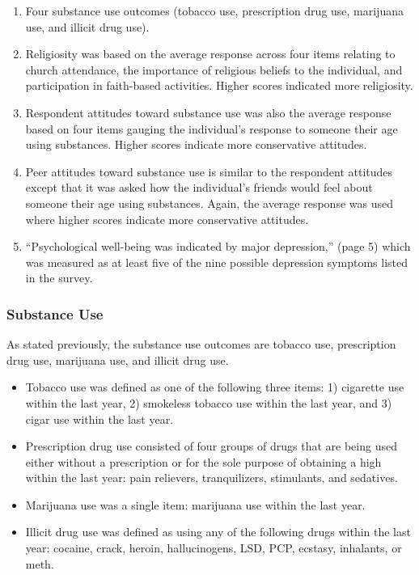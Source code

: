 \documentclass[]{DissertateUSU}
\providecommand{\tightlist}{%
  \setlength{\itemsep}{0pt}\setlength{\parskip}{0pt}}
\begin{document}
\begin{enumerate}
\def\labelenumi{\arabic{enumi}.}
\tightlist
\item
  Four substance use outcomes (tobacco use, prescription drug use,
  marijuana use, and illicit drug use).
\item
  Religiosity was based on the average response across four items
  relating to church attendance, the importance of religious beliefs to
  the individual, and participation in faith-based activities. Higher
  scores indicated more religiosity.
\item
  Respondent attitudes toward substance use was also the average
  response based on four items gauging the individual's response to
  someone their age using substances. Higher scores indicate more
  conservative attitudes.
\item
  Peer attitudes toward substance use is similar to the respondent
  attitudes except that it was asked how the individual's friends would
  feel about someone their age using substances. Again, the average
  response was used where higher scores indicate more conservative
  attitudes.
\item
  ``Psychological well-being was indicated by major depression,'' (page
  5) which was measured as at least five of the nine possible depression
  symptoms listed in the survey.
\end{enumerate}

\subsubsection{Substance Use}\label{substance-use}

As stated previously, the substance use outcomes are tobacco use,
prescription drug use, marijuana use, and illicit drug use.

\begin{itemize}
\tightlist
\item
  Tobacco use was defined as one of the following three items: 1)
  cigarette use within the last year, 2) smokeless tobacco use within
  the last year, and 3) cigar use within the last year.
\item
  Prescription drug use consisted of four groups of drugs that are being
  used either without a prescription or for the sole purpose of
  obtaining a high within the last year: pain relievers, tranquilizers,
  stimulants, and sedatives.
\item
  Marijuana use was a single item: marijuana use within the last year.
\item
  Illicit drug use was defined as using any of the following drugs
  within the last year: cocaine, crack, heroin, hallucinogens, LSD, PCP,
  ecstasy, inhalants, or meth.
\end{itemize}
\end{document}
